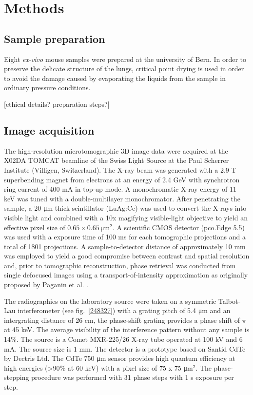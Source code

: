 \section{Methods}\label{sec:methods}
\subsection{Sample preparation}
Eight \emph{ex-vivo} mouse samples were prepared at the university of Bern.
In order to preserve the delicate structure of the lungs, critical point
drying is used in order to avoid the damage caused by evaporating the liquids
from the sample in ordinary pressure conditions.

[ethical details? preparation steps?]

\subsection{Image acquisition}\label{sec:acquisition}
The high-resolution microtomographic 3D image data were acquired at the X02DA TOMCAT beamline of the Swiss Light Source at the Paul Scherrer Institute (Villigen, Switzerland). The X-ray beam was generated with a 2.9 T superbending magnet from electrons at an energy of 2.4 GeV with synchrotron ring current of 400 mA in top-up mode. A monochromatic X-ray energy of 11 keV was tuned with a double-multilayer monochromator. After penetrating the sample, a 20 μm thick scintillator (LuAg:Ce) was used to convert the X-rays into visible light and combined with a 10x magifying visible-light objective to yield an effective pixel size of $0.65 \times 0.65\,$μm$^2$. A scientific CMOS detector (pco.Edge 5.5) was used with a exposure time of 100 ms for each tomographic projections and a total of 1801 projections. A sample-to-detector distance of approximately 10 mm was employed to yield a good compromise between contrast and spatial resolution and, prior to tomographic reconstruction, phase retrieval was conducted from single defocused images using a transport-of-intensity approximation as originally proposed by Paganin et al. \cite{Paganin2002}.

The radiographies on the laboratory source were taken on a symmetric
Talbot-Lau interferometer (see fig.~\ref{248327}) with a grating pitch of 5.4 μm and an intergrating
distance of 26 cm, the phase-shift grating provides a phase shift of $\pi$
at 45 keV. The average visibility of the interference pattern without any
sample is 14\%. The source is a Comet MXR-225/26 X-ray tube operated at 100
kV and 6 mA. The source size is 1 mm. The detector is a prototype based on
Santid CdTe by Dectris Ltd. The CdTe 750 μm sensor provides high quantum
efficiency at high energies (>90\% at 60 keV) with a pixel size of 75 x 75
μm$^2$. The phase-stepping procedure was performed with 31 phase steps with
1 s exposure per step.
